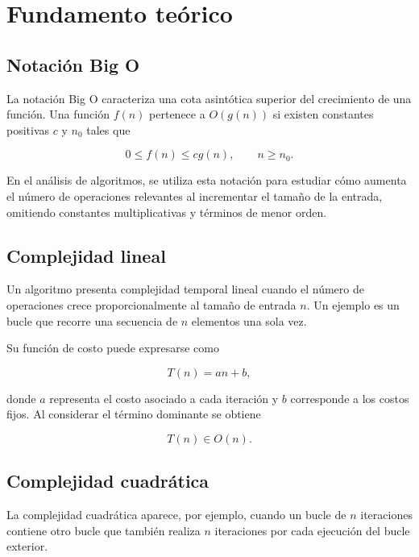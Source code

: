 \documentclass[runningheads]{llncs}
\begin{document}
\section{Fundamento teórico}

\subsection{Notación Big O}

La notación Big O caracteriza una cota asintótica
superior del crecimiento de una función. Una función
$f(n)$ pertenece a $O(g(n))$ si existen constantes
positivas $c$ y $n_0$ tales que

\begin{equation}
0 \leq f(n) \leq c g(n),
\qquad n \geq n_0.
\end{equation}

En el análisis de algoritmos, se utiliza esta
notación para estudiar cómo aumenta el número de
operaciones relevantes al incrementar el tamaño
de la entrada, omitiendo constantes multiplicativas
y términos de menor orden.

\subsection{Complejidad lineal}

Un algoritmo presenta complejidad temporal lineal
cuando el número de operaciones crece
proporcionalmente al tamaño de entrada $n$.
Un ejemplo es un bucle que recorre una secuencia
de $n$ elementos una sola vez.

Su función de costo puede expresarse como

\begin{equation}
T(n)=an+b,
\end{equation}

donde $a$ representa el costo asociado a cada
iteración y $b$ corresponde a los costos fijos.
Al considerar el término dominante se obtiene

\begin{equation}
T(n) \in O(n).
\end{equation}

\subsection{Complejidad cuadrática}

La complejidad cuadrática aparece, por ejemplo,
cuando un bucle de $n$ iteraciones contiene otro
bucle que también realiza $n$ iteraciones por
cada ejecución del bucle exterior.
\end{document}
